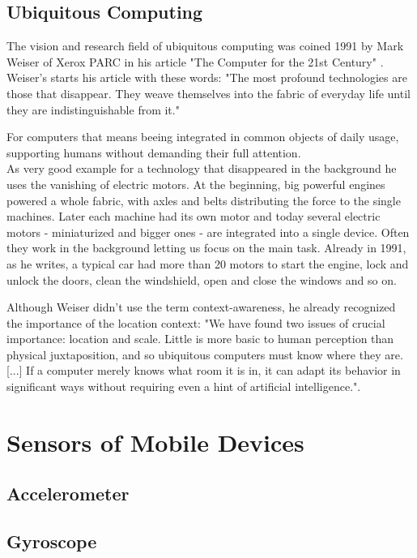 \subsection{Ubiquitous Computing}

The vision and research field of ubiquitous computing was coined 1991 by Mark Weiser of Xerox PARC in his article "The Computer for the 21st Century" \cite{weiserm1991}. 
Weiser's starts his article with these words:
"The most profound technologies are those that disappear. They weave themselves into the fabric of everyday life until they are indistinguishable from it."

For computers that means beeing integrated in common objects of daily usage, supporting humans without demanding their full attention. \\
As very good example for a technology that disappeared in the background he uses the vanishing of electric motors. At the beginning, big powerful engines powered a whole fabric, with axles and belts distributing the force to the single machines. Later each machine had its own motor and today several electric motors - miniaturized and bigger ones - are integrated into a single device. Often they work in the background letting us focus on the main task. Already in 1991, as he writes, a typical car had more than 20 motors to start the engine, lock and unlock the doors, clean the windshield, open and close the windows and so on. 

Although Weiser didn't use the term context-awareness, he already recognized the importance of the location context: "We have found two issues of crucial importance: location and scale. Little is more basic to human perception than physical juxtaposition, and so ubiquitous computers must know where they are. [...] If a computer merely knows what room it is in, it can adapt its behavior in significant ways without requiring even a hint of artificial intelligence.".

\section{Sensors of Mobile Devices}

\subsection{Accelerometer}

\subsection{Gyroscope}

